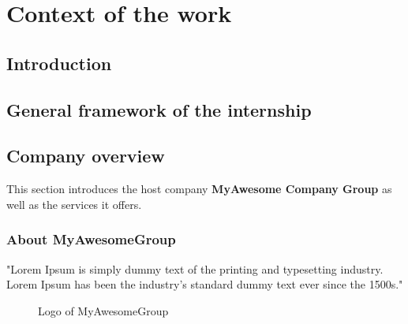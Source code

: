 \chapter{Context of the work}
\minitoc
\newpage

\setcounter{secnumdepth}{0} %
\section{Introduction}
\lipsum[2][1-5]

\setcounter{secnumdepth}{2} %
\section{General framework of the internship}
\lipsum[2]

\section{Company overview}
This section introduces the host company {\bf MyAwesome Company Group} as well as the services it offers.

\subsection{About MyAwesomeGroup}
"Lorem Ipsum is simply dummy text of the printing and typesetting industry. Lorem Ipsum has been the industry's standard dummy text ever since the 1500s." \cite{about-lorem}
\begin{figure}[H]
    \centering
    \caption{Logo of MyAwesomeGroup}
    \label{fig:logo-of-myawesomegroup}
\end{figure}

